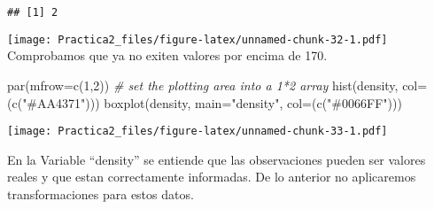 \documentclass[
]{article}
\newenvironment{Shaded}{\begin{snugshade}}{\end{snugshade}}
\newcommand{\AttributeTok}[1]{\textcolor[rgb]{0.77,0.63,0.00}{#1}}
\newcommand{\CommentTok}[1]{\textcolor[rgb]{0.56,0.35,0.01}{\textit{#1}}}
\newcommand{\ConstantTok}[1]{\textcolor[rgb]{0.00,0.00,0.00}{#1}}
\newcommand{\ControlFlowTok}[1]{\textcolor[rgb]{0.13,0.29,0.53}{\textbf{#1}}}
\newcommand{\DecValTok}[1]{\textcolor[rgb]{0.00,0.00,0.81}{#1}}
\newcommand{\FunctionTok}[1]{\textcolor[rgb]{0.00,0.00,0.00}{#1}}
\newcommand{\NormalTok}[1]{#1}
\newcommand{\OtherTok}[1]{\textcolor[rgb]{0.56,0.35,0.01}{#1}}
\newcommand{\SpecialCharTok}[1]{\textcolor[rgb]{0.00,0.00,0.00}{#1}}
\newcommand{\StringTok}[1]{\textcolor[rgb]{0.31,0.60,0.02}{#1}}
\begin{document}
\begin{verbatim}
## [1] 2
\end{verbatim}

\begin{Shaded}
\end{Shaded}

\begin{Shaded}
\end{Shaded}

\texttt{[image: Practica2\_files/figure-latex/unnamed-chunk-32-1.pdf]}
Comprobamos que ya no exiten valores por encima de 170.

\begin{Shaded}
\begin{Highlighting}[]
\FunctionTok{par}\NormalTok{(}\AttributeTok{mfrow=}\FunctionTok{c}\NormalTok{(}\DecValTok{1}\NormalTok{,}\DecValTok{2}\NormalTok{))    }\CommentTok{\# set the plotting area into a 1*2 array}
\FunctionTok{hist}\NormalTok{(density, }\AttributeTok{col=}\NormalTok{(}\FunctionTok{c}\NormalTok{(}\StringTok{"\#AA4371"}\NormalTok{)))}
\FunctionTok{boxplot}\NormalTok{(density, }\AttributeTok{main=}\StringTok{"density"}\NormalTok{, }\AttributeTok{col=}\NormalTok{(}\FunctionTok{c}\NormalTok{(}\StringTok{"\#0066FF"}\NormalTok{)))}
\end{Highlighting}
\end{Shaded}

\texttt{[image: Practica2\_files/figure-latex/unnamed-chunk-33-1.pdf]}

En la Variable ``density'' se entiende que las observaciones pueden ser
valores reales y que estan correctamente informadas. De lo anterior no
aplicaremos transformaciones para estos datos.
\end{document}
